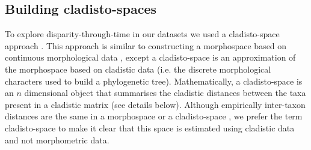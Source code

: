 \documentclass[12pt,a4paper]{article}
\begin{document}
\subsection{Building cladisto-spaces} %
To explore disparity-through-time in our datasets we used a cladisto-space approach \citep[e.g.][]{Foote01071994,Foote29111996,Wesley-Hunt2005,Brusatte12092008,friedmanexplosive2010,toljagictriassic-jurassic2013,Hughes20082013}.
This approach is similar to constructing a morphospace based on continuous morphological data \citep[e.g.][]{friedmanexplosive2010}, except a cladisto-space is an approximation of the morphospace based on cladistic data (i.e. the discrete morphological characters used to build a phylogenetic tree).
Mathematically, a cladisto-space is an $n$ dimensional object that summarises the cladistic distances between the taxa present in a cladistic matrix (see details below).
Although empirically inter-taxon distances are the same in a morphospace or a cladisto-space \citep{foth2012different,hetherington2015cladistic}, we prefer the term cladisto-space to make it clear that this space is estimated using cladistic data and not morphometric data. %
\end{document}
